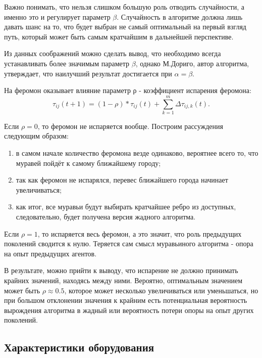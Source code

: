 \documentclass[../main.tex]{subfiles}
\begin{document}
	Важно понимать, что нельзя слишком большую роль отводить случайности, а именно это и регулирует параметр $\beta$. 
	Случайность в алгоритме должна лишь давать шанс на то, что будет выбран не самый оптимальный на первый взгляд путь, который может быть самым кратчайшим в дальнейшей перспективе.
	
	Из данных соображений можно сделать вывод, что необходимо всегда устанавливать более значимым параметр $\beta$, однако М.Дориго, автор алгоритма, утверждает, что наилучший результат достигается при $\alpha = \beta$.
	
	На феромон оказывает влияние параметр ρ - коэффициент испарения феромона:
	\begin{equation*}
		τ_{ij}(t+1) = (1-ρ) * τ_{ij}(t) + \sum \limits_{k=1}^m \Delta τ_{ij,k}(t).
	\end{equation*}
	
	Если $ρ = 0$, то феромон не испаряется вообще. Построим рассуждения следующим образом:
	\begin{enumerate}
		\item в самом начале количество феромона везде одинаково, вероятнее всего то, что муравей пойдёт к самому ближайшему городу; 
		
		\item так как феромон не испарялся, перевес ближайшего города начинает увеличиваться;
		
		\item как итог, все муравьи будут выбирать кратчайшее ребро из доступных, следовательно, будет получена версия жадного алгоритма.
	\end{enumerate}

	Если $ρ = 1$, то испаряется весь феромон, а это значит, что роль предыдущих поколений сводится к нулю. Теряется сам смысл муравьиного алгоритма - опора на опыт предыдущих агентов.
	
	В результате, можно прийти к выводу, что испарение не должно принимать крайних значений, находясь между ними. Вероятно, оптимальным значением может быть $ρ \approx 0.5$, которое может несколько увеличиваться или уменьшаться, но при большом отклонении значения к крайним есть потенциальная вероятность вырождения алгоритма в жадный или вероятность потери опоры на опыт других поколений.
	
\subsection{Характеристики оборудования}
	
\end{document}
